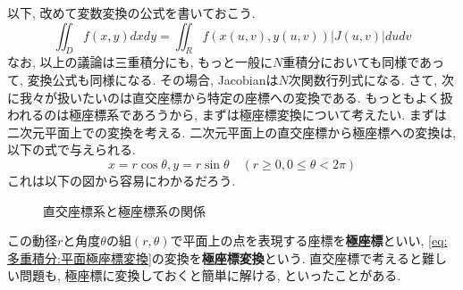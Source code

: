\documentclass[a4j,dvipdfmx]{jsarticle}
\numberwithin{equation}{section}
\begin{document}
            以下, 改めて変数変換の公式を書いておこう.
            \begin{equation}
                \iint_D f(x,y)dxdy = \iint_R f(x(u,v),y(u,v))|J(u,v)|dudv \label{eq:多重積分:変数変換の公式}
            \end{equation}
            なお, 以上の議論は三重積分にも, もっと一般に$N$重積分においても同様であって, 変換公式も同様になる. その場合, Jacobianは$N$次関数行列式になる.
            \clearpage
            さて, 次に我々が扱いたいのは直交座標から特定の座標への変換である. もっともよく扱われるのは極座標系であろうから, まずは極座標変換について考えたい. まずは二次元平面上での変換を考える.
            二次元平面上の直交座標から極座標への変換は, 以下の式で与えられる.
            \begin{equation}
                x=r\cos\theta, y=r\sin\theta \quad (r\geq 0,0\leq \theta<2\pi) \label{eq:多重積分:平面極座標変換}
            \end{equation}
            これは以下の図から容易にわかるだろう.
            \begin{figure}[h]
                \centering
                \caption{直交座標系と極座標系の関係}
            \end{figure}

            この動径$r$と角度$\theta$の組$(r,\theta)$で平面上の点を表現する座標を\textbf{極座標}といい, 
            \eqref{eq:多重積分:平面極座標変換}の変換を\textbf{極座標変換}という. 直交座標で考えると難しい問題も,
            極座標に変換しておくと簡単に解ける, といったことがある. 
\end{document}
